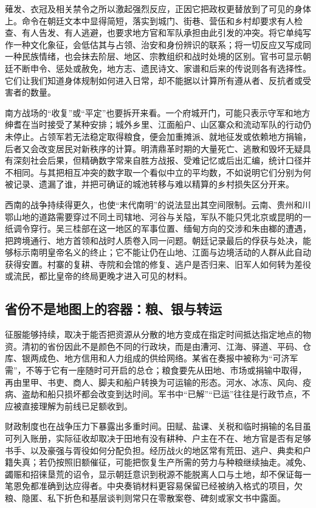 薙发、衣冠及相关禁令之所以激起强烈反应，正因它把政权更替放到了可见的身体上。命令在朝廷文本中显得简短，落实到城门、街巷、营伍和乡村却要求有人检查、有人告发、有人逃避，也要求地方官和军队承担由此引发的冲突。将它单纯写作一种文化象征，会低估其与占领、治安和身份辨识的联系；将一切反应又写成同一种民族情绪，也会抹去阶层、地区、宗教组织和战时处境的区别。官书可显示朝廷不断申令、惩处或赦免，地方志、遗民诗文、家谱和后来的传说则各有选择性。它们让我们知道身体规制如何进入日常，却不能据以计算所有遵从者、反抗者或受害者的数量。

南方战场的“收复”或“平定”也要拆开来看。一个府城开门，可能只表示守军和地方绅耆在当时接受了某种安排；城外乡里、江面船户、山区寨众和流动军队的行动仍未停止。占领军若无法稳定取得粮食，便会加重摊派、就地征发或依赖地方捐输，后者又会改变居民对新秩序的计算。明清鼎革时期的大量死亡、逃散和毁坏无疑具有深刻社会后果，但精确数字常来自胜方战报、受难记忆或后出汇编，统计口径并不相同。与其把相互冲突的数字取一个看似中立的平均数，不如说明它们分别为何被记录、遗漏了谁，并把可确证的城池转移与难以精算的乡村损失区分开来。

西南的战争持续得更久，也使“末代南明”的说法显出其空间限制。云南、贵州和川鄂山地的道路需要穿过不同土司辖地、河谷与关隘，军队不能只凭北京或昆明的一纸调令穿行。吴三桂部在这一地区的军事位置、缅甸方向的交涉和朱由榔的遭遇，把跨境通行、地方首领和战时人质卷入同一问题。朝廷记录最后的俘获与处决，能够标示南明皇帝名义的终止；它不能让仍在山地、江面与边境活动的人群从此自动获得安置。村寨的复耕、寺院和会馆的修复、逃户是否归来、旧军人如何转为差役或流民，都比皇帝的终局更晚才进入可见的材料。

\subsection*{省份不是地图上的容器：粮、银与转运}
征服能够持续，取决于能否把资源从分散的地方变成在指定时间抵达指定地点的物资。清初的省份因此不是颜色不同的行政块，而是由漕河、江海、驿道、平码、仓库、银两成色、地方信用和人力组成的供给网络。某省在奏报中被称为“可济军需”，不等于它有一座随时可开启的总仓；粮食要先从田地、市场或捐输中取得，再由里甲、书吏、商人、脚夫和船户转换为可运输的形态。河水、冰冻、风向、疫病、盗劫和船只损坏都会改变到达时间。军书中“已解”“已运”往往是行政节点，不应被直接理解为前线已足额收到。

财政制度也在战争压力下暴露出多重时间。田赋、盐课、关税和临时捐输的名目虽可列入账册，实际征收却取决于田地有没有耕种、户主在不在、地方官是否有足够书手、以及豪强与胥役如何分配负担。经历战火的地区常有荒田、逃户、典卖和户籍失真；若仍按照旧额催征，可能把恢复生产所需的劳力与种粮继续抽走。减免、蠲赈和招徕垦荒的诏令，显示朝廷意识到税源不能脱离人口与土地，却不保证每一笔恩免都准确到达应得者。中央奏销材料更容易保留已经被纳入格式的项目，欠粮、隐匿、私下折色和基层谈判则常只在零散案卷、碑刻或家文书中露面。

